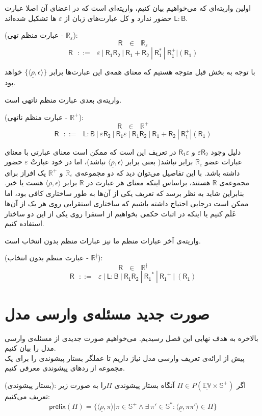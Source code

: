 اولین واریته‌ای که می‌خواهیم بیان کنیم، واریته‌ای است که در اعضای آن اصلا عبارت 
$\mathsf{L : B}$
حضور ندارد و کل عبارت‌های زبان از $\varepsilon$ ها تشکیل شده‌اند.
\begin{defn}
	(عبارت منظم تهی - $\mathbb{R_\varepsilon}$): 
	$$\mathsf{R} \:\:\:\in\:\:\: \mathbb{R}_\varepsilon$$
	$$\mathsf{R}\:\:\: ::= \:\:\: \varepsilon \: | \: \mathsf{R_1 R_2} \: | 
	\: \mathsf{R_1 + R_2} \: | \: \mathsf{R_1^*} \: | \: \mathsf{R_1^+} | (\mathsf{R_1})$$
\end{defn}


 با توجه به بخش قبل متوجه هستیم که معنای همه‌ی این عبارت‌ها برابر 
$\{\langle \underline{\rho} , \epsilon \rangle\}$
خواهد بود.

واریته‌ی بعدی عبارت منظم ناتهی است.
\begin{defn}
	(عبارت منظم ناتهی - $\mathbb{R}^+$):
	$$\mathsf{R} \:\:\:\in\:\:\: \mathbb{R}^+$$
	$$\mathsf{R}\:\:\: ::= \:\:\: \mathsf{L:B} \: |
	\: \mathsf{\varepsilon R_2} \: | \: \mathsf{R_1 \varepsilon} \: |
	\: \mathsf{R_1 R_2} \: | 
	\: \mathsf{R_1 + R_2} \: | \: \mathsf{R_1^+} | (\mathsf{R_1})$$
\end{defn}
دلیل وجود 
$\mathsf{\varepsilon R_2}$
و 
$\mathsf{R_1 \varepsilon}$
در تعریف این است که ممکن است معنای عبارتی با معنای عبارات عضو $\mathbb{R}_\varepsilon$ برابر نباشد( بعنی برابر ${\langle \underline{\rho} , \epsilon \rangle}$ نباشد)، اما در خود عبارتْ $\varepsilon$ حضور داشته باشد. با این تفاصیل می‌توان دید که دو مجموعه‌ی 
$\mathbb{R}_\varepsilon$
و
$\mathbb{R}^+$
یک افراز برای مجموعه‌ی $\mathbb{R}$ هستند، براساس اینکه معنای هر عبارت در $\mathbb{R}$ برابر ${\langle \underline{\rho} , \epsilon \rangle}$ هست یا خیر. بنابراین شاید به نظر برسد که تعریف یکی از آن‌ها به طور ساختاری کافی بود، اما ممکن است درجایی احتیاج داشته باشیم که ساختاری استقرایی روی هر یک از آن‌ها عَلَم کنیم یا اینکه در اثبات حکمی بخواهیم از استقرا روی یکی از این دو ساختار استفاده کنیم.

واریته‌ی آخر عبارات منظم ما نیز عبارات منظم بدون انتخاب است.
\begin{defn}
(عبارت منظم بدون انتخاب - $\mathbb{R}^\nmid$):
$$
\mathsf{R}\:\:\: \in \:\:\: \mathbb{R}^\nmid$$
$$
\mathsf{R}\:\:\: ::= \:\:\: \varepsilon \: | \: \mathsf{L:B} \: | \:
\mathsf{R_1 R_2} \: | \: \mathsf{R_1}^* \: | \: \mathsf{R_1}^+ \: | \:
(\mathsf{R_1})$$
\end{defn}

\section{صورت جدید مسئله‌ی وارسی مدل}
بالاخره به هدف نهایی این فصل رسیدیم. می‌خواهیم صورت جدیدی از مسئله‌ی وارسی مدل را بیان ‌کنیم.\\
پیش از ارائه‌ی تعریف وارسی مدل نیاز داریم تا عملگر بستار پیشوندی را برای یک مجموعه از ردهای پیشوندی معرفی کنیم.
\begin{defn}
	(بستار پیشوندی):
	اگر 
	$\Pi \in \mathit{P}(\mathbb{\underline{EV}\times S^+})$
	آنگاه بستار پیشوندی $\Pi$را به صورت زیر تعریف می‌کنیم:
	$$\mathsf{prefix}(\Pi)=
	\{\langle \underline{\rho},\pi\rangle | \pi \in \mathbb{S^+} \land \exists\
	\pi' \in \mathbb{S^*}: \langle \underline{\rho}, \pi \pi' \rangle \in \Pi \}$$
\end{defn}

